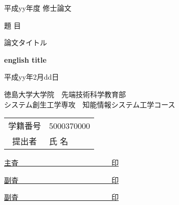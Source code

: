 \documentclass[12pt,twoside]{jreport}  %
\begin{document}
\begin{titlepage}
\begin{center}
\Large

平成yy年度 修士論文\\
\vspace*{3zh}

題 目 \\

\vspace*{3zh}

{\Huge
  論文タイトル\\
}

\vspace*{2zh}

{\Large\bf
  english title\\
}

\normalsize
\vspace*{2zh}

平成yy年2月dd日\\

\vspace*{2zh}


徳島大学大学院　先端技術科学教育部\\
システム創生工学専攻　知能情報システム工学コース\\

\vspace*{3zh}

\begin{table} [h!]
  \centering
  \begin{tabular} {cl}
      学籍番号 & 5000370000\\
      提出者 & 氏 名
  \end{tabular}
\end{table}

\Large
\vspace*{3zh}

\underline{主査　　　　　　　　　　　　　{\normalsize 印}}

\vspace*{1zh}

\underline{副査　　　　　　　　　　　　　{\normalsize 印}}

\vspace*{1zh}

\underline{副査　　　　　　　　　　　　　{\normalsize 印}}

\vspace*{5mm}
\end{center}
\end{titlepage}
\end{document}
